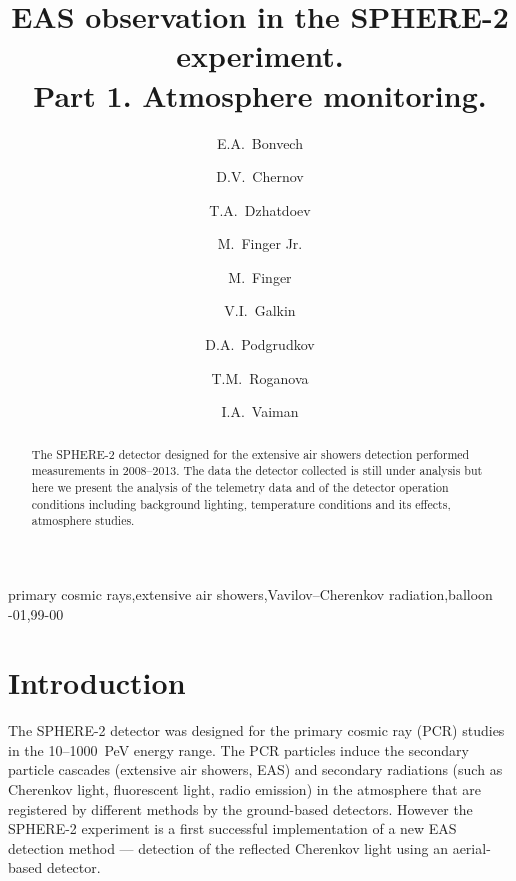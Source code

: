 \documentclass[final,5p,times,twocolumn]{elsarticle}
\begin{document}
\tableofcontents  %
\listoftodos
\linenumbers

\begin{frontmatter}
\title{EAS observation in the SPHERE-2 experiment. \\ Part 1. Atmosphere monitoring.}

\author[address1]{E.A.~Bonvech}
\author[address1]{D.V.~Chernov}
\author[address1]{T.A.~Dzhatdoev}
\author[address2,address3]{M.~Finger Jr.}
\author[address2,address3]{M.~Finger}
\author[address4]{V.I.~Galkin}
\author[address4,address1]{D.A.~Podgrudkov}
\author[address1]{T.M.~Roganova}
\author[address4,address1]{I.A.~Vaiman}
\address[address1]{M.V. Lomonosov Moscow State University, Skobeltsyn Institute of Nuclear Physics (SINP MSU), Moscow, Russia}
\address[address2]{Charles University, Faculty of Mathematics and Physics, Prague, Czech Republic}
\address[address3]{Joint Institute for Nuclear Research, Dubna, Russian Federation}
\address[address4]{M.V. Lomonosov Moscow State University, Department of Physics, Moscow, Russia}

\begin{abstract}
The SPHERE-2 detector designed for the extensive air showers detection performed measurements in 2008--2013. The data the detector collected is still under analysis but here we present the analysis of the telemetry data and of the detector operation conditions including background lighting, temperature conditions and its effects, atmosphere studies.
\end{abstract}

\begin{keyword}
primary cosmic rays\sep extensive air showers\sep Vavilov--Cherenkov radiation\sep balloon
-01\sep  99-00
\end{keyword}
\end{frontmatter}


\section{Introduction}
The SPHERE-2 detector was designed for the primary cosmic ray (PCR) studies in the 10--1000~PeV energy range. The PCR particles induce the secondary particle cascades (extensive air showers, EAS) and secondary radiations (such as Cherenkov light, fluorescent light, radio emission) in the atmosphere that are registered by different methods by the ground-based detectors. However the SPHERE-2 experiment is a first successful implementation of a new EAS detection method --- detection of the reflected Cherenkov light using an aerial-based detector. 
\end{document}

